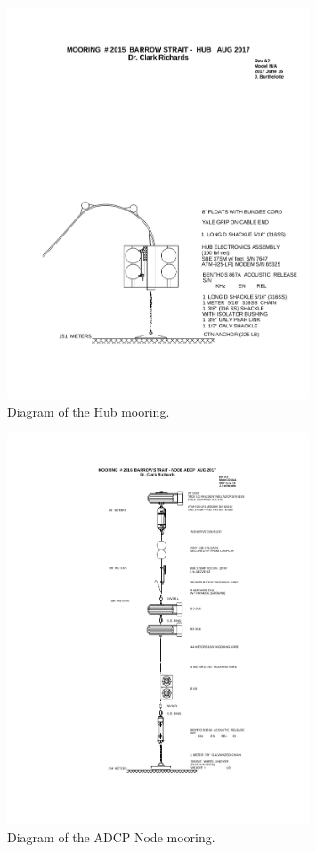 \documentclass[12pt]{dforeport}
\begin{document}
\begin{figure}
\centering
\includegraphics[width = 0.8\textwidth]{./figures/HUB.png}
\caption[Mooring Diagram: Hub]{Diagram of the Hub mooring.}
\label{f:md_hub}
\end{figure}

\begin{figure}
\centering
\includegraphics[width = 0.8\textwidth]{./figures/ADCP.png}
\caption[Mooring Diagram: ADCP Node]{Diagram of the ADCP Node mooring.}
\label{f:md_adcp}
\end{figure}
\end{document}
